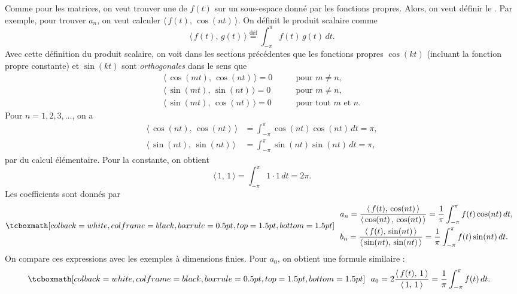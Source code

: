 Comme pour les matrices, on veut trouver une  \emph{}
de $f(t)$ sur un sous-espace donné par les fonctions propres. Alors, on veut définir le \emph{}. Par exemple, pour trouver $a_n$, on veut calculer $\langle \, f(t), \, \cos (nt) \, \rangle$.
On définit le produit scalaire comme
\begin{equation*}
\langle \, f(t), \, g(t) \, \rangle \overset{\text{déf}}{=}
\int_{-\pi}^\pi f(t) \, g(t) \, dt .
\end{equation*}
Avec cette définition du produit scalaire, on voit dans les sections précédentes que les fonctions propres  $\cos (kt)$
(incluant la fonction propre constante) et
$\sin (kt)$ sont \emph{orthogonales} dans le sens que
\begin{align*}
\langle \, \cos (mt), \, \cos (nt) \, \rangle = 0 & \qquad \text{pour } m \not= n , \\
\langle \, \sin (mt), \, \sin (nt) \, \rangle = 0 & \qquad \text{pour } m \not= n , \\
\langle \, \sin (mt), \, \cos (nt) \, \rangle = 0 & \qquad \text{pour tout } m \text{ et } n .
\end{align*}
Pour $n=1,2,3,\ldots$,
on a
\begin{align*}
\langle \, \cos (nt), \, \cos (nt) \, \rangle &=
\int_{-\pi}^\pi \cos(nt)\cos(nt) \, dt
=
\pi,
\\
\langle \, \sin (nt), \, \sin (nt) \, \rangle &=
\int_{-\pi}^\pi \sin(nt)\sin(nt) \, dt
=
\pi,
\end{align*}
par du calcul élémentaire. Pour la constante, on obtient
\begin{equation*}
\langle \, 1, \, 1 \, \rangle
=
\int_{-\pi}^\pi 1 \cdot 1 \, dt
 = 2\pi.
\end{equation*}
Les coefficients sont donnés par
\begin{equation*}
\mybxbg{~~
\begin{aligned}
& a_n =
\frac{\langle \, f(t), \, \cos (nt) \, \rangle}{\langle \, \cos (nt) \, , \,
\cos (nt) \, \rangle}
= 
\frac{1}{\pi} \int_{-\pi}^\pi f(t) \cos (nt) \, dt , \\
& b_n =
\frac{\langle \, f(t), \, \sin (nt) \, \rangle}{\langle \, \sin (nt), \,
\sin (nt) \, \rangle}
= 
\frac{1}{\pi} \int_{-\pi}^\pi f(t) \sin (nt) \, dt .
\end{aligned}
~~}
\end{equation*}
On compare ces expressions avec les exemples à dimensions finies. 
Pour $a_0$, on obtient une formule similaire :
\begin{equation*}
\mybxbg{~~
a_0 = 2
\frac{\langle \, f(t), \, 1 \, \rangle}{\langle \, 1, \,
1 \, \rangle}
=
\frac{1}{\pi} \int_{-\pi}^\pi f(t) \, dt .
~~}
\end{equation*}

